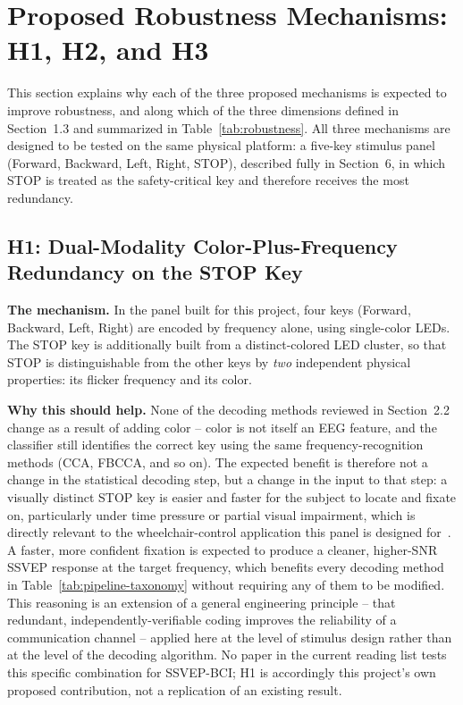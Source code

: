 \documentclass[11pt]{article}
\begin{document}
\section{Proposed Robustness Mechanisms: H1, H2, and H3}

This section explains why each of the three proposed mechanisms is expected to improve robustness, and along which of the three dimensions defined in Section~1.3 and summarized in Table~\ref{tab:robustness}. All three mechanisms are designed to be tested on the same physical platform: a five-key stimulus panel (Forward, Backward, Left, Right, STOP), described fully in Section~6, in which STOP is treated as the safety-critical key and therefore receives the most redundancy.

\subsection{H1: Dual-Modality Color-Plus-Frequency Redundancy on the STOP Key}

\textbf{The mechanism.} In the panel built for this project, four keys (Forward, Backward, Left, Right) are encoded by frequency alone, using single-color LEDs. The STOP key is additionally built from a distinct-colored LED cluster, so that STOP is distinguishable from the other keys by \emph{two} independent physical properties: its flicker frequency and its color.

\textbf{Why this should help.} None of the decoding methods reviewed in Section~2.2 change as a result of adding color -- color is not itself an EEG feature, and the classifier still identifies the correct key using the same frequency-recognition methods (CCA, FBCCA, and so on). The expected benefit is therefore not a change in the statistical decoding step, but a change in the input to that step: a visually distinct STOP key is easier and faster for the subject to locate and fixate on, particularly under time pressure or partial visual impairment, which is directly relevant to the wheelchair-control application this panel is designed for~\cite{nicolasalonso2012bci}. A faster, more confident fixation is expected to produce a cleaner, higher-SNR SSVEP response at the target frequency, which benefits every decoding method in Table~\ref{tab:pipeline-taxonomy} without requiring any of them to be modified. This reasoning is an extension of a general engineering principle -- that redundant, independently-verifiable coding improves the reliability of a communication channel -- applied here at the level of stimulus design rather than at the level of the decoding algorithm. No paper in the current reading list tests this specific combination for SSVEP-BCI; H1 is accordingly this project's own proposed contribution, not a replication of an existing result.
\end{document}
